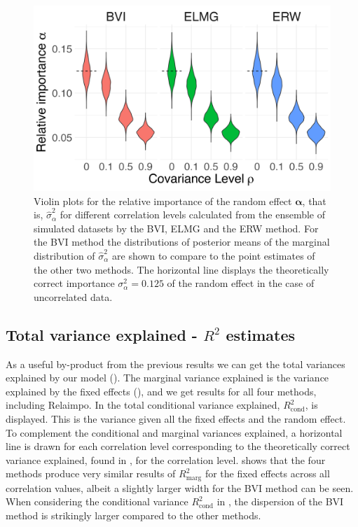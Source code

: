 \begin{figure}[ht]
  \centering
  \includegraphics[width=0.7\linewidth]{Figures/ViolinPlots/Variance_gamma.png}
  \caption{Violin plots for the relative importance of the random effect $\boldsymbol{\alpha}$, that is, $\hat{\sigma}^2_{\alpha}$ for different correlation levels calculated from the ensemble of simulated datasets by the BVI, ELMG and the ERW method. For the BVI method the distributions of posterior means of the marginal distribution of $\hat{\sigma}^2_{\alpha}$ are shown to compare to the point estimates of the other two methods. The horizontal line displays the theoretically correct importance $\sigma^2_{\alpha} = 0.125$ of the random effect in the case of uncorrelated data.}
  \label{fig:relimp_alpha}
\end{figure}

\subsection{Total variance explained - $R^2$ estimates}
\label{sec:R2} 
As a useful by-product from the previous results we can get the total variances explained by our model ().
The marginal variance explained is the variance explained by the fixed effects (), and we get results for all four methods, including Relaimpo.
In  the total conditional variance explained, $R^2_{\text{cond}}$, is displayed. 
This is the variance given all the fixed effects and the random effect.
To complement the conditional and marginal variances explained, a horizontal line is drawn for each correlation level corresponding to the theoretically correct variance explained, found in , for the correlation level. 
\newline
\newline
{} shows that the four methods produce very similar results of $R^2_{\text{marg}}$ for the fixed effects across all correlation values, albeit a slightly larger width for the BVI method can be seen.
When considering the conditional variance $R^2_{\text{cond}}$ in , the dispersion of the BVI method is strikingly larger compared to the other methods. 

